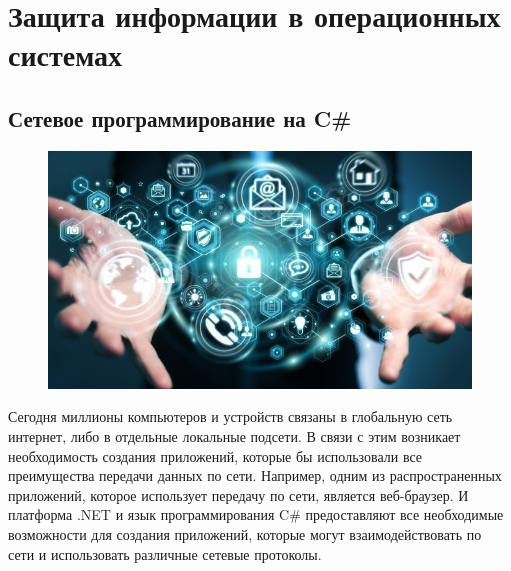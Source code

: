 \documentclass[a4paper, 12pt]{report}
\begin{document}
	
	
	
	\chapter{Защита информации в операционных системах}
	\section{Сетевое программирование на C#}
	
	 \begin{figure}[h]
		
		\centering
		\includegraphics[width=0.5\linewidth]{full_dbGCToKq.jpg}
		
	\end{figure}

	Сегодня миллионы компьютеров и устройств связаны в глобальную сеть интернет, либо в отдельные локальные подсети. В связи с этим возникает необходимость создания приложений, которые бы использовали все преимущества передачи данных по сети. Например, одним из распространенных приложений, которое использует передачу по сети, является веб-браузер. И платформа .NET и язык программирования C# предоставляют все необходимые возможности для создания приложений, которые могут взаимодействовать по сети и использовать различные сетевые протоколы.
	
\end{document}
